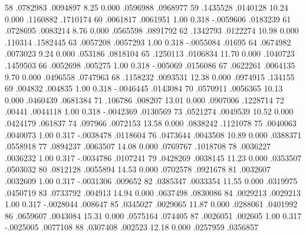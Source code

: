          58  {\VBAR}   .0782983   .0094897     8.25   0.000     .0596988    .0968977
         59  {\VBAR}   .1435528   .0140128    10.24   0.000     .1160882    .1710174
         60  {\VBAR}   .0061817   .0061951     1.00   0.318    -.0059606    .0183239
         61  {\VBAR}   .0728695   .0083214     8.76   0.000     .0565598    .0891792
         62  {\VBAR}   .1342793   .0122274    10.98   0.000      .110314    .1582445
         63  {\VBAR}   .0057208   .0057293     1.00   0.318    -.0055084      .01695
         64  {\VBAR}   .0674982   .0073023     9.24   0.000      .053186    .0818104
         65  {\VBAR}   .1250113   .0106834    11.70   0.000     .1040723    .1459503
         66  {\VBAR}   .0052698    .005275     1.00   0.318     -.005069    .0156086
         67  {\VBAR}   .0622261   .0064135     9.70   0.000     .0496558    .0747963
         68  {\VBAR}   .1158232   .0093531    12.38   0.000     .0974915     .134155
         69  {\VBAR}    .004832    .004835     1.00   0.318    -.0046445    .0143084
         70  {\VBAR}   .0570911   .0056365    10.13   0.000     .0460439    .0681384
         71  {\VBAR}    .106786    .008207    13.01   0.000     .0907006    .1228714
         72  {\VBAR}     .00441   .0044118     1.00   0.318    -.0042369    .0130569
         73  {\VBAR}   .0521274   .0049539    10.52   0.000     .0424179     .061837
         74  {\VBAR}    .097966   .0072153    13.58   0.000     .0838242    .1121078
         75  {\VBAR}   .0040063   .0040073     1.00   0.317    -.0038478    .0118604
         76  {\VBAR}   .0473644   .0043508    10.89   0.000     .0388371    .0558918
         77  {\VBAR}   .0894237   .0063507    14.08   0.000     .0769767    .1018708
         78  {\VBAR}   .0036227   .0036232     1.00   0.317    -.0034786    .0107241
         79  {\VBAR}   .0428269   .0038145    11.23   0.000     .0353507    .0503032
         80  {\VBAR}   .0812128   .0055894    14.53   0.000     .0702578    .0921678
         81  {\VBAR}   .0032607   .0032609     1.00   0.317    -.0031306     .009652
         82  {\VBAR}   .0385347   .0033354    11.55   0.000     .0319975    .0450719
         83  {\VBAR}   .0733792    .004913    14.94   0.000     .0637498    .0830086
         84  {\VBAR}   .0029213   .0029213     1.00   0.317    -.0028044     .008647
         85  {\VBAR}   .0345027   .0029065    11.87   0.000     .0288061    .0401992
         86  {\VBAR}   .0659607   .0043084    15.31   0.000     .0575164     .074405
         87  {\VBAR}   .0026051    .002605     1.00   0.317    -.0025005    .0077108
         88  {\VBAR}   .0307408    .002523    12.18   0.000     .0257959    .0356857
